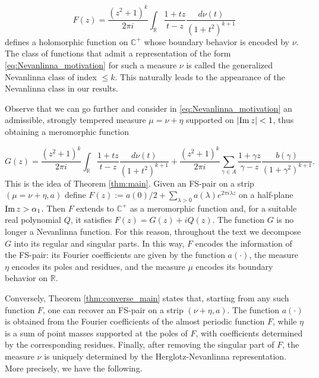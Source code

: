 \documentclass[a4paper,reqno,12pt]{amsart}
\renewcommand{\r}{\mathbb{R}}
\newcommand{\cp}{\mathbb{C}} %
\newcommand{\la}{\lambda}
\newcommand{\ga}{\gamma}
\newcommand{\al}{\alpha}
\newcommand{\1}{{\bf 1}}
\renewcommand{\Im}{{\rm Im}\,}
\begin{document}
\begin{equation}
\label{eq:Nevanlinna_motivation}
    F(z)=\frac{(z^2+1)^k}{2\pi i}\int_{\r} \frac{1+tz}{t-z}\frac{d\nu(t)}{(1+t^2)^{k+1}}
\end{equation}
defines a holomorphic function on $\mathbb{C}^+$ whose boundary behavior is encoded by $\nu$. The class of functions that admit a representation of the form \eqref{eq:Nevanlinna_motivation} for such a measure $\nu$ is called the generalized Nevanlinna class of index $\leq k$. This naturally leads to the appearance of the Nevanlinna class in our results.

Observe that we can go further and consider in \eqref{eq:Nevanlinna_motivation} an admissible, strongly tempered measure $\mu=\nu+\eta$ supported on $|\Im{z}|<1$, thus obtaining a meromorphic function

\begin{equation}
    G(z)=\frac{(z^2+1)^k}{2\pi i}\int_{\r} \frac{1+tz}{t-z}\frac{d\nu(t)}{(1+t^2)^{k+1}}+\frac{(z^2+1)^k}{2\pi i}\sum_{\ga\in A} \frac{1+\ga z}{\ga-z}\frac{b(\ga)}{(1+\ga^2)^{k+1}}.
\end{equation}
This is the idea of Theorem \ref{thm:main}. Given an FS-pair on a strip $(\mu=\nu+\eta,a)$ define $F(z):=a(0)/2+\sum_{\la>0} a(\la)e^{2\pi i\la z}$ on a half-plane $\Im{z}>\al_1$. Then $F$ extends to $\cp^+$ as a meromorphic function and, for a suitable real polynomial $Q$, it satisfies $F(z)=G(z)+iQ(z)$. The function $G$ is no longer a Nevanlinna function. For this reason, throughout the text we decompose $G$ into its regular and singular parts. In this way, $F$ encodes the information of the FS-pair: its Fourier coefficients are given by the function $a(\cdot)$, the measure $\eta$ encodes its poles and residues, and the measure $\mu$ encodes its boundary behavior on $\mathbb{R}$.

Conversely, Theorem \ref{thm:converse_main} states that, starting from any such function $F$, one can recover an FS-pair on a strip $(\nu+\eta,a)$. The function $a(\cdot)$ is obtained from the Fourier coefficients of the almost periodic function $F$, while $\eta$ is a sum of point masses supported at the poles of $F$, with coefficients determined by the corresponding residues. Finally, after removing the singular part of $F$, the measure $\nu$ is uniquely determined by the Herglotz-Nevanlinna representation. More precisely, we have the following.
\vspace{3mm}
\end{document}
